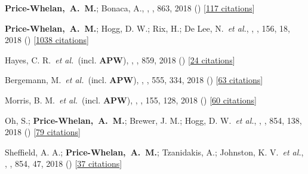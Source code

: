 {\item[{\color{deemph}\scriptsize41}]\textbf{Price-Whelan,~A.~M.}; Bonaca, A., , \apj, 863, 2018 () [\href{http://adsabs.harvard.edu/abs/2018ApJ...863L..20P}{117 citations}]

\item[{\color{deemph}\scriptsize40}]\textbf{Price-Whelan,~A.~M.}; Hogg, D. W.; Rix, H.; De Lee, N.~\textit{et al.}, , \aj, 156, 18, 2018 () [\href{http://adsabs.harvard.edu/abs/2018AJ....156...18P}{1038 citations}]

\item[{\color{deemph}\scriptsize39}]Hayes, C. R.~\textit{et al.}~(incl. \textbf{APW}), , \apj, 859, 2018 () [\href{http://adsabs.harvard.edu/abs/2018ApJ...859L...8H}{24 citations}]

\item[{\color{deemph}\scriptsize38}]Bergemann, M.~\textit{et al.}~(incl. \textbf{APW}), , \nature, 555, 334, 2018 () [\href{http://adsabs.harvard.edu/abs/2018Natur.555..334B}{63 citations}]

\item[{\color{deemph}\scriptsize37}]Morris, B. M.~\textit{et al.}~(incl. \textbf{APW}), , \aj, 155, 128, 2018 () [\href{http://adsabs.harvard.edu/abs/2018AJ....155..128M}{60 citations}]

\item[{\color{deemph}\scriptsize36}]Oh, S.; \textbf{Price-Whelan,~A.~M.}; Brewer, J. M.; Hogg, D. W.~\textit{et al.}, , \apj, 854, 138, 2018 () [\href{http://adsabs.harvard.edu/abs/2018ApJ...854..138O}{79 citations}]

\item[{\color{deemph}\scriptsize35}]Sheffield, A. A.; \textbf{Price-Whelan,~A.~M.}; Tzanidakis, A.; Johnston, K. V.~\textit{et al.}, , \apj, 854, 47, 2018 () [\href{http://adsabs.harvard.edu/abs/2018ApJ...854...47S}{37 citations}]

}
